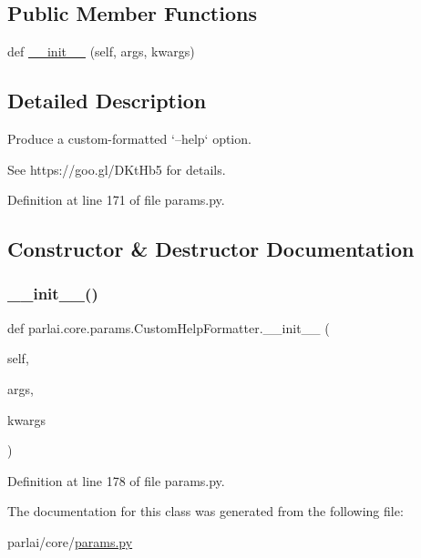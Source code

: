 \subsection*{Public Member Functions}
\begin{DoxyCompactItemize}
\item 
def \hyperlink{classparlai_1_1core_1_1params_1_1CustomHelpFormatter_a4111203088995f375f8679fee61020b0}{\+\_\+\+\_\+init\+\_\+\+\_\+} (self, args, kwargs)
\end{DoxyCompactItemize}


\subsection{Detailed Description}
\begin{DoxyVerb}Produce a custom-formatted `--help` option.

See https://goo.gl/DKtHb5 for details.
\end{DoxyVerb}
 

Definition at line 171 of file params.\+py.



\subsection{Constructor \& Destructor Documentation}
\mbox{\label{classparlai_1_1core_1_1params_1_1CustomHelpFormatter_a4111203088995f375f8679fee61020b0}} 
\subsubsection{\texorpdfstring{\+\_\+\+\_\+init\+\_\+\+\_\+()}{\_\_init\_\_()}}
{\footnotesize\ttfamily def parlai.\+core.\+params.\+Custom\+Help\+Formatter.\+\_\+\+\_\+init\+\_\+\+\_\+ (\begin{DoxyParamCaption}\item[{}]{self,  }\item[{}]{args,  }\item[{}]{kwargs }\end{DoxyParamCaption})}



Definition at line 178 of file params.\+py.



The documentation for this class was generated from the following file\+:\begin{DoxyCompactItemize}
\item 
parlai/core/\hyperlink{params_8py}{params.\+py}\end{DoxyCompactItemize}

